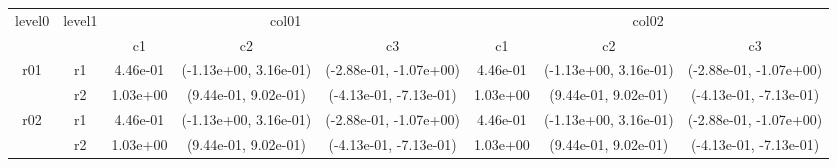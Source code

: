 \begin{tabular}{cccccccc}
\toprule
\multirow{2}{*}{level0} & \multirow{2}{*}{level1}&\multicolumn{3}{c}{col01}&\multicolumn{3}{c}{col02}\tabularnewline
\cmidrule(lr){3-5}
\cmidrule(lr){6-8}
&&c1&c2&c3&c1&c2&c3\tabularnewline
\midrule
\midrule
\multirow{2}{*}{r01}&r1&4.46e-01& (-1.13e+00, 3.16e-01)& (-2.88e-01, -1.07e+00)&4.46e-01& (-1.13e+00, 3.16e-01)& (-2.88e-01, -1.07e+00)\tabularnewline
&r2&1.03e+00& (9.44e-01, 9.02e-01)& (-4.13e-01, -7.13e-01)&1.03e+00& (9.44e-01, 9.02e-01)& (-4.13e-01, -7.13e-01)\tabularnewline
\midrule
\multirow{2}{*}{r02}&r1&4.46e-01& (-1.13e+00, 3.16e-01)& (-2.88e-01, -1.07e+00)&4.46e-01& (-1.13e+00, 3.16e-01)& (-2.88e-01, -1.07e+00)\tabularnewline
&r2&1.03e+00& (9.44e-01, 9.02e-01)& (-4.13e-01, -7.13e-01)&1.03e+00& (9.44e-01, 9.02e-01)& (-4.13e-01, -7.13e-01)\tabularnewline
\bottomrule
\end{tabular}

